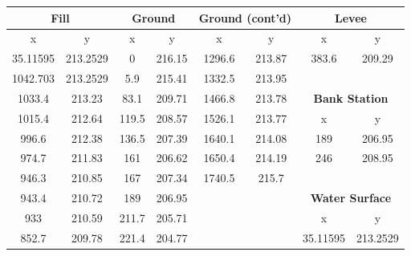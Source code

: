 \begin{center}
\begin{tabular}{|cccc|cc|cc|} 
    \hline
    \multicolumn{2}{|c}{\textbf{Fill}} & \multicolumn{2}{c|}{\textbf{Ground}} & \multicolumn{2}{c|}{\textbf{Ground (cont'd)}} & \multicolumn{2}{c|}{\textbf{Levee}}           \\ 
    \hline
    x        & y                       & x      & y                           & x      & y                           & x        & y                                  \\
    35.11595 & 213.2529                & 0      & 216.15                      & 1296.6 & 213.87                      & 383.6    & 209.29                             \\
    1042.703 & 213.2529                & 5.9    & 215.41                      & 1332.5 & 213.95                      &          &                                    \\
    1033.4   & 213.23                  & 83.1   & 209.71                      & 1466.8 & 213.78                      & \multicolumn{2}{c|}{\textbf{Bank Station}}    \\ 
    \cline{7-8}
    1015.4   & 212.64                  & 119.5  & 208.57                      & 1526.1 & 213.77                      & x        & y                                  \\
    996.6    & 212.38                  & 136.5  & 207.39                      & 1640.1 & 214.08                      & 189      & 206.95                             \\
    974.7    & 211.83                  & 161    & 206.62                      & 1650.4 & 214.19                      & 246      & 208.95                             \\
    946.3    & 210.85                  & 167    & 207.34                      & 1740.5 & 215.7                       &          &                                    \\
    943.4    & 210.72                  & 189    & 206.95                      &        &                             & \multicolumn{2}{c|}{\textbf{Water Surface}}   \\ 
    \cline{7-8}
    933      & 210.59                  & 211.7  & 205.71                      &        &                             & x        & y                                  \\
    852.7    & 209.78                  & 221.4  & 204.77                      &        &                             & 35.11595 & 213.2529                           \\

\end{tabular}
\end{center}
